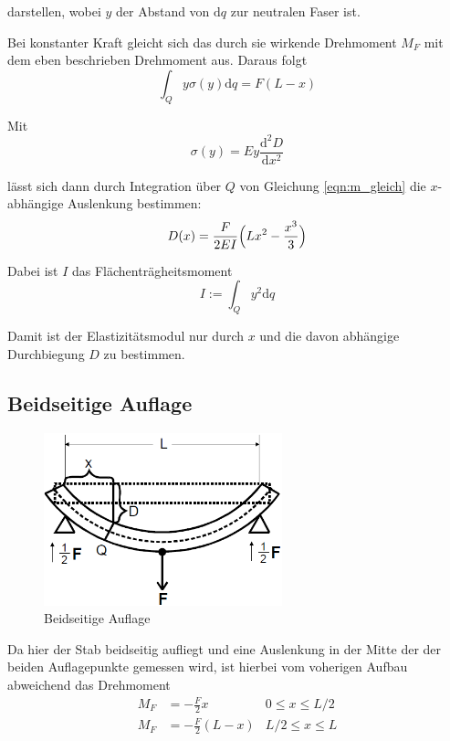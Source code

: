 darstellen, wobei $y$ der Abstand von $\text{d}q$ zur neutralen Faser ist.

Bei konstanter Kraft gleicht sich das durch sie wirkende Drehmoment $M_F$ mit dem eben beschrieben Drehmoment aus. Daraus folgt \begin{equation}
    \label{eqn:m_gleich}
    \int_Q y\sigma(y)\text{d}q = F (L - x) 
\end{equation}

Mit \begin{equation}
    \sigma (y) = E y \frac{\text{d}^2 D}{\text{d} x^2}
\end{equation}

lässt sich dann durch Integration über $Q$ von Gleichung \eqref{eqn:m_gleich} die $x$- abhängige Auslenkung bestimmen:
\begin{equation}
    D(x) = \frac{F}{2EI} \Bigl( L x^2 - \frac{x^3}3 \Bigr)
    \label{eqn:D1_gleich}
\end{equation}

Dabei ist $I$ das Flächenträgheitsmoment \begin{equation}
    I := \int_Q y^2 \text{d}q
    \label{eqn:I}
\end{equation}

Damit ist der Elastizitätsmodul nur durch $x$ und die davon abhängige Durchbiegung $D$ zu bestimmen.

\subsection{Beidseitige Auflage}
\begin{figure}
    \centering
    \includegraphics[height=5cm]{data/bild_2}
    \caption{Beidseitige Auflage}
\end{figure}

\FloatBarrier

Da hier der Stab beidseitig aufliegt und eine Auslenkung in der Mitte der der beiden Auflagepunkte gemessen wird, ist hierbei
vom voherigen Aufbau abweichend das Drehmoment \begin{align}
M_F &= - \frac{F}2 x       &   0 \leq x \leq L/2 \\
M_F &= - \frac{F}2 (L - x) & L/2 \leq x \leq L
\end{align}

